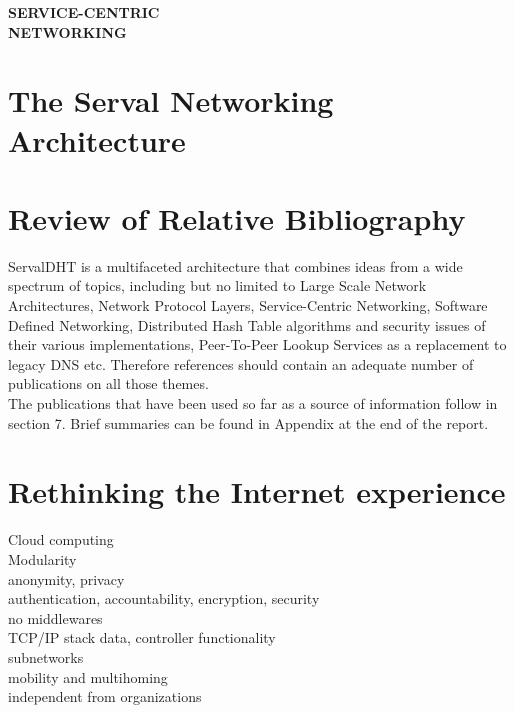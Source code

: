 \documentclass[12pt,a4paper,oneside]{article}
\begin{document}
\newpage
\thispagestyle{empty}
{\Huge \bf \noindent SERVICE-CENTRIC\\ NETWORKING}
\newpage

\newpage
\section{The Serval Networking Architecture}



\newpage
\section{Review of Relative Bibliography}
ServalDHT is a multifaceted architecture that combines ideas from a wide spectrum of topics, including but no limited to Large Scale Network Architectures, Network Protocol Layers, Service-Centric Networking, Software Defined Networking, Distributed Hash Table algorithms and security issues of their various implementations, Peer-To-Peer Lookup Services as a replacement to legacy DNS etc.
Therefore references should contain an adequate number of publications on all those themes.\\
\indent The publications that have been used so far as a source of information follow in section 7.
Brief summaries can be found in Appendix at the end of the report.


\newpage
\section{Rethinking the Internet experience}
Cloud computing
\\Modularity
\\anonymity, privacy
\\authentication, accountability, encryption, security
\\no middlewares
\\TCP/IP stack data, controller functionality
\\subnetworks
\\mobility and multihoming
\\independent from organizations


\newpage
\end{document}
